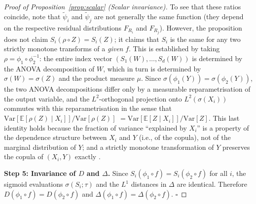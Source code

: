 \documentclass[11pt,onecolumn]{article}
\begin{document}
\begin{proof}[Proof of Proposition~\ref{prop:scalar} (Scalar invariance)]
To see that these ratios coincide, note that $\tilde{\psi}_i$ and $\tilde{\psi}_j$
are not generally the same function (they depend on the respective residual
distributions $F_{R_i}$ and $F_{R_j}$).  However, the proposition does not
claim $S_i(\rho \circ Z) = S_i(Z)$; it claims that $S_i$ is the same for
any two strictly monotone transforms of a \emph{given} $f$.  This is
established by taking $\rho = \phi_1 \circ \phi_2^{-1}$: the entire
index vector $(S_1(W), \ldots, S_d(W))$ is determined by the ANOVA
decomposition of $W$, which in turn is determined by $\sigma(W) = \sigma(Z)$
and the product measure $\mu$.  Since $\sigma(\phi_1(Y)) = \sigma(\phi_2(Y))$,
the two ANOVA decompositions differ only by a measurable reparametrisation of
the output variable, and the $L^2$-orthogonal projection onto $L^2(\sigma(X_i))$
commutes with this reparametrisation in the sense that
$\mathrm{Var}[\mathbb{E}[\rho(Z)\mid X_i]]/\mathrm{Var}[\rho(Z)]$
$= \mathrm{Var}[\mathbb{E}[Z\mid X_i]]/\mathrm{Var}[Z]$.
This last identity holds because the fraction of variance ``explained by
$X_i$'' is a property of the dependence structure between $X_i$ and $Y$
(i.e., of the copula), not of the marginal distribution of $Y$; and a
strictly monotone transformation of $Y$ preserves the copula of
$(X_i, Y)$ exactly \citep{Sklar1959}.

\textbf{Step 5: Invariance of $D$ and $\Delta$.}\quad
Since $S_i(\phi_1 \circ f) = S_i(\phi_2 \circ f)$ for all $i$, the
sigmoid evaluations $\sigma(S_i;\tau)$ and the $L^1$ distances in $\Delta$
are identical.  Therefore $D(\phi_1 \circ f) = D(\phi_2 \circ f)$ and
$\Delta(\phi_1 \circ f) = \Delta(\phi_2 \circ f)$.  $\square$
\end{proof}
\end{document}
